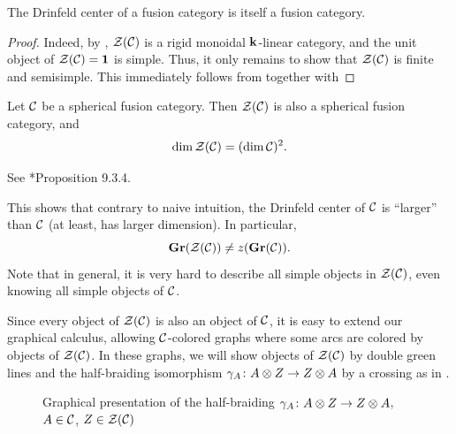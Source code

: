 \begin{theorem}\label{t:drinfeld-fusion}
  The Drinfeld center of a fusion category is itself a fusion category.
\end{theorem}
\begin{proof}
  Indeed, by , $\mathcal{Z}(\mathcal{C})$ is a rigid monoidal
  $\mathbf{k}$-linear  category, and the  unit object of $\mathcal{Z}(\mathcal{C})=\mathbf{1}$ is
  simple. Thus, it only remains to show that $\mathcal{Z}(\mathcal{C})$ is finite and
  semisimple. This  immediately follows from  together
  with 
\end{proof}

\begin{theorem}\label{t:drinfeld-dim}
  Let $\mathcal{C}$ be a spherical fusion category. Then $\mathcal{Z}(\mathcal{C})$ is also a
  spherical fusion category, and
  $$
    \dim \mathcal{Z}(\mathcal{C}) = (\dim \mathcal{C})^2.
  $$
\end{theorem}
See *{Proposition 9.3.4}.
\begin{remark}\label{r:drinfeld-size}
  This shows that contrary to naive intuition, the Drinfeld center  of $\mathcal{C}$
  is ``larger'' than $\mathcal{C}$ (at least, has larger dimension). In particular,
  $$
  \mathbf{Gr}(\mathcal{Z}(\mathcal{C}))\ne z(\mathbf{Gr}(\mathcal{C})).
  $$
   Note that in general, it is very hard to describe all simple objects in
   $\mathcal{Z}(\mathcal{C})$, even knowing all simple objects of $\mathcal{C}$.
\end{remark}

Since every object of $\mathcal{Z}(\mathcal{C})$ is also an object of $\mathcal{C}$, it is easy
to extend our graphical calculus, allowing $\mathcal{C}$-colored graphs where some
arcs are colored by objects of $\mathcal{Z}(\mathcal{C})$. In these graphs, we
will show objects of $\mathcal{Z}(\mathcal{C})$ by double green lines and the
half-braiding isomorphism $\gamma_A\colon A\otimes Z\to Z\otimes A$ by a
crossing as in .
\begin{figure}[ht]

  \caption{Graphical presentation of the half-braiding
    $\gamma_A\colon A\otimes Z\to Z\otimes A$,
    $A\in \mathcal{C}$, $Z\in \mathcal{Z}(\mathcal{C})$ }\label{f:crossing}
\end{figure}


